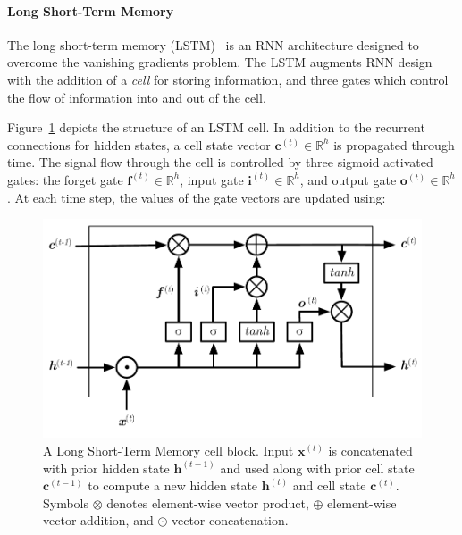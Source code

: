 

\paragraph*{Long Short-Term Memory}

The long short-term memory (LSTM)~\cite{Hochreiter1997} is an RNN architecture designed to overcome the vanishing gradients problem. The LSTM augments RNN design with the addition of a \emph{cell} for storing information, and three gates which control the flow of information into and out of the cell.

Figure~\ref{fig:lstm-block} depicts the structure of an LSTM cell. In addition to the recurrent connections for hidden states, a cell state vector $\bm{c}^{(t)} \in \mathbb{R}^h$ is propagated through time. The signal flow through the cell is controlled by three sigmoid activated gates: the forget gate $\bm{f}^{(t)} \in \mathbb{R}^h$, input gate $\bm{i}^{(t)} \in \mathbb{R}^h$, and output gate $\bm{o}^{(t)} \in \mathbb{R}^h$. At each time step, the values of the gate vectors are updated using:

\begin{figure}
  \centering
  \includegraphics[width=.8\columnwidth]{img/lstm-block}%
  \caption[Long Short-Term Memory cell architecture]{%
    A Long Short-Term Memory cell block. Input $\bm{x}^{(t)}$ is concatenated with prior hidden state $\bm{h}^{(t-1)}$ and used along with prior cell state $\bm{c}^{(t-1)}$ to compute a new hidden state $\bm{h}^{(t)}$ and cell state $\bm{c}^{(t)}$. Symbols $\otimes$ denotes element-wise vector product, $\oplus$ element-wise vector addition, and $\odot$ vector concatenation.%
  }%
  \label{fig:lstm-block}
\end{figure}

